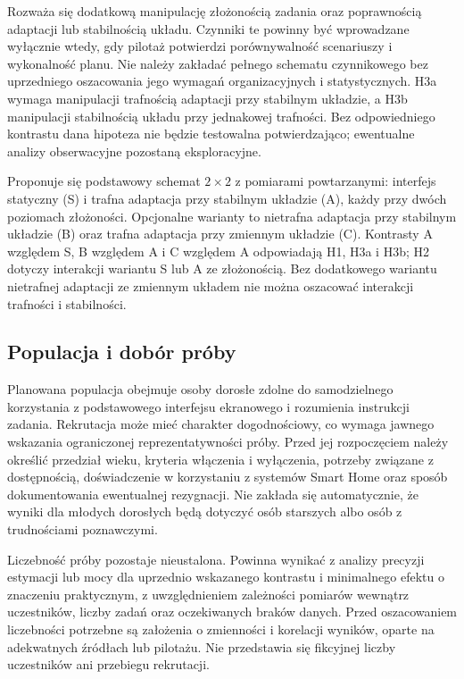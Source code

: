 \documentclass[11pt,a4paper]{article}
\begin{document}
Rozważa się dodatkową manipulację złożonością zadania oraz poprawnością adaptacji lub stabilnością układu. Czynniki te powinny być wprowadzane wyłącznie wtedy, gdy pilotaż potwierdzi porównywalność scenariuszy i wykonalność planu. Nie należy zakładać pełnego schematu czynnikowego bez uprzedniego oszacowania jego wymagań organizacyjnych i statystycznych. H3a wymaga manipulacji trafnością adaptacji przy stabilnym układzie, a H3b manipulacji stabilnością układu przy jednakowej trafności. Bez odpowiedniego kontrastu dana hipoteza nie będzie testowalna potwierdzająco; ewentualne analizy obserwacyjne pozostaną eksploracyjne.

Proponuje się podstawowy schemat $2\times2$ z pomiarami powtarzanymi: interfejs statyczny (S) i trafna adaptacja przy stabilnym układzie (A), każdy przy dwóch poziomach złożoności. Opcjonalne warianty to nietrafna adaptacja przy stabilnym układzie (B) oraz trafna adaptacja przy zmiennym układzie (C). Kontrasty A względem S, B względem A i C względem A odpowiadają H1, H3a i H3b; H2 dotyczy interakcji wariantu S lub A ze złożonością. Bez dodatkowego wariantu nietrafnej adaptacji ze zmiennym układem nie można oszacować interakcji trafności i stabilności.

\subsection{Populacja i dobór próby}

Planowana populacja obejmuje osoby dorosłe zdolne do samodzielnego korzystania z podstawowego interfejsu ekranowego i rozumienia instrukcji zadania. Rekrutacja może mieć charakter dogodnościowy, co wymaga jawnego wskazania ograniczonej reprezentatywności próby. Przed jej rozpoczęciem należy określić przedział wieku, kryteria włączenia i wyłączenia, potrzeby związane z dostępnością, doświadczenie w korzystaniu z systemów Smart Home oraz sposób dokumentowania ewentualnej rezygnacji. Nie zakłada się automatycznie, że wyniki dla młodych dorosłych będą dotyczyć osób starszych albo osób z trudnościami poznawczymi.

Liczebność próby pozostaje nieustalona. Powinna wynikać z analizy precyzji estymacji lub mocy dla uprzednio wskazanego kontrastu i minimalnego efektu o znaczeniu praktycznym, z uwzględnieniem zależności pomiarów wewnątrz uczestników, liczby zadań oraz oczekiwanych braków danych. Przed oszacowaniem liczebności potrzebne są założenia o zmienności i korelacji wyników, oparte na adekwatnych źródłach lub pilotażu. Nie przedstawia się fikcyjnej liczby uczestników ani przebiegu rekrutacji.
\end{document}
